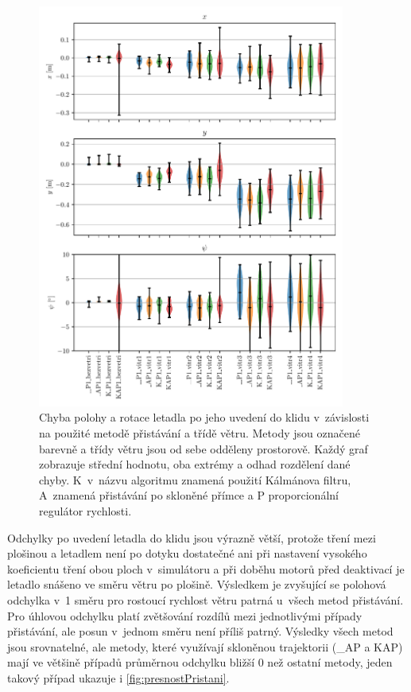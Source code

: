     \begin{figure}[H]
      \centering
      \includegraphics[width=0.9\textwidth]{img/results/presnostPristani.pdf}
      \caption[Chyba přistání]{Chyba polohy a rotace letadla po jeho uvedení do klidu v~závislosti na použité metodě přistávání a třídě větru. Metody jsou označené barevně a třídy větru jsou od sebe odděleny prostorově. Každý graf zobrazuje střední hodnotu, oba extrémy a odhad rozdělení dané chyby. K~v~názvu algoritmu znamená použití Kálmánova filtru, A~znamená přistávání po skloněné přímce a P proporcionální regulátor rychlosti.}
      \label{fig:pristaniViolin}
    \end{figure}

    Odchylky po uvedení letadla do klidu jsou výrazně větší, protože tření mezi plošinou a letadlem není po dotyku dostatečné ani při nastavení vysokého koeficientu tření obou ploch v~simulátoru a při doběhu motorů před deaktivací je letadlo snášeno ve směru větru po plošině. Výsledkem je zvyšující se polohová odchylka v~1 směru pro rostoucí rychlost větru patrná u~všech metod přistávání. Pro úhlovou odchylku platí zvětšování rozdílů mezi jednotlivými případy přistávání, ale posun v~jednom směru není příliš patrný. Výsledky všech metod jsou srovnatelné, ale metody, které využívají skloněnou trajektorii (\_AP a KAP) mají ve většině případů průměrnou odchylku bližší 0 než ostatní metody, jeden takový případ ukazuje i \cref{fig:presnostPristani}.

